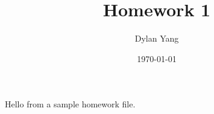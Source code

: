 \documentclass[../main.tex]{subfiles}
\title{Homework 1}
\author{Dylan Yang}
\date{\today}
\begin{document}

Hello from a sample homework file.
\end{document}
